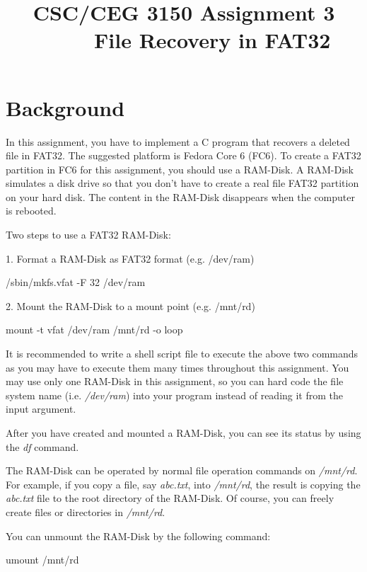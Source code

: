 \documentclass[a4paper,12pt]{article}
\title{{\bf CSC/CEG 3150 Assignment 3 ~~~~~File Recovery in FAT32}}
\author{}
\date{}
\begin{document}
\maketitle



\section*{Background}

In this assignment, you have to implement a C program that recovers a deleted file in FAT32. The suggested platform is Fedora Core 6 (FC6). To create a FAT32 partition in FC6 for this assignment, you should use a RAM-Disk. A RAM-Disk simulates a disk drive so that you don't have to create a real file FAT32 partition on your hard disk. The content in the RAM-Disk disappears when the computer is rebooted.

Two steps to use a FAT32 RAM-Disk:

1. Format a RAM-Disk as FAT32 format (e.g. /dev/ram)

\begin{center}
/sbin/mkfs.vfat -F 32 /dev/ram
\end{center}

2. Mount the RAM-Disk to a mount point (e.g. /mnt/rd)

\begin{center}
mount -t vfat /dev/ram /mnt/rd -o loop
\end{center}

It is recommended to write a shell script file to execute the above two commands as you may have to execute them many times throughout this assignment. You may use only one RAM-Disk in this assignment, so you can hard code the file system name (i.e. \textit{/dev/ram}) into your program instead of reading it from the input argument.

After you have created and mounted a RAM-Disk, you can see its status by using the \textit{df} command.

The RAM-Disk can be operated by normal file operation commands on \textit{/mnt/rd}. For example, if you copy a file, say \textit{abc.txt}, into \textit{/mnt/rd}, the result is copying the \textit{abc.txt} file to the root directory of the RAM-Disk. Of course, you can freely create files or directories in \textit{/mnt/rd}.

You can unmount the RAM-Disk by the following command:
\begin{center}
umount /mnt/rd
\end{center}
\end{document}
